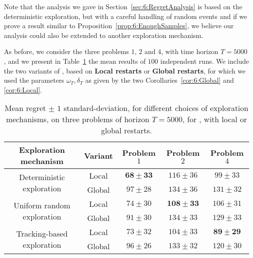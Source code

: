 Note that the analysis we gave in Section~\ref{sec:6:RegretAnalysis} is based on the deterministic exploration, but with a careful handling of random events and if we prove a result similar to Proposition~\ref{prop:6:EnoughSamples}, we believe our analysis could also be extended to another exploration mechanism.

As before, we consider the three problems $1$, $2$ and $4$, with time horizon $T=5000$,
and we present in Table~\ref{table:6:exploringDifferentForcedExplorationMechanisms} the mean results of $100$ independent runs.
We include the two variants of \GLRklUCB, based on \textbf{Local restarts} or \textbf{Global restarts}, for which we used the parameters $\omega_T,\delta_T$ as given by the two Corollaries~\ref{cor:6:Global} and \ref{cor:6:Local}.

\begin{table}[ht]
    \centering
    \begin{tabular}{cc|ccc}
        \textbf{Exploration mechanism} & Variant & Problem $1$ & Problem $2$ & Problem $4$ \\
        \hline
        \multirow{2}{*}{Deterministic exploration}
        & Local   & $\mathbf{68 \pm 33}$ & $116 \pm 36$ & $99 \pm 33$ \\
        & Global  & $97 \pm 28$ & $134 \pm 36$ & $131 \pm 32$ \\
        \hline
        \multirow{2}{*}{Uniform random exploration}
        & Local  & $74 \pm 30$ & $\mathbf{108 \pm 33}$ & $106 \pm 31$ \\
        & Global & $91 \pm 30$ & $134 \pm 33$ & $129 \pm 33$ \\
        \hline
        \multirow{2}{*}{Tracking-based exploration}
        & Local  & $73 \pm 32$ & $104 \pm 33$ & $\mathbf{89 \pm 29}$ \\
        & Global & $96 \pm 26$ & $133 \pm 32$ & $120 \pm 30$
    \end{tabular}
    \caption{Mean regret $\pm$ $1$ standard-deviation, for different choices of exploration mechanisms, on three problems of horizon $T=5000$, for \GLRklUCB, with local or global restarts.}
    \label{table:6:exploringDifferentForcedExplorationMechanisms}
\end{table}

